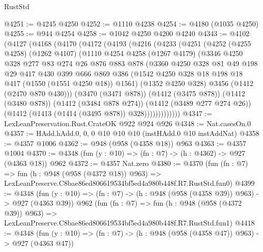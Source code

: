 \begin{lexlean}{RustStd}
\begin{coremodule}
@4251 := @4245 @4250
@4252 := @1110 @4238
@4254 := @4180 (@1035 @4250)
@4255 := @944 @4254
@4258 := @1042 @4250 @4200 @4240
@4343 := @4102
    (@4127
      (@4168
        (@4170
          (@4172
            (@4193
              (@4216
                (@4233
                  (@4251
                    (@4252
                      (@4255 @4258)
                      (@1262 @4107)
                      (@1110
                        @4254
                        @4258
                        (@1267 @4179)
                        (@3346
                          @4250
                          @328
                          @277
                          @83
                          @274
                          @26
                          @876
                          @883
                          @878
                          (@3360
                            @4250
                            @328
                            @81
                            @49
                            @198
                            @29
                            @417
                            @430
                            @399
                            @666
                            @869
                            @386
                            (@1542 @4250 @328 @18 @198 @18 @417 (@1550 (@1551 @4250 @18)) @1561)
                            (@1352 @4250 @328)
                            @3456
                            (@1412 (@2470 @870 @430)))
                          (@3470 (@3471 @878))
                          (@1412 (@3475 @878))
                          (@1412 (@3480 @878))
                          (@1412 (@3484 @878 @274))
                          (@1412 (@3489 @277 @274 @26))
                          (@1412 (@1413 (@1414 (@3495 @878)) @328)))))))))))))
@4347 := LexLeanPreservation.Rust.CrateOK @922 @924 @926
@4348 := Nat.casesOn.{0}
@4357 := HAdd.hAdd.{0, 0, 0} @10 @10 @10 (instHAdd.{0} @10 instAddNat)
@4358 := @4357 @1006
@4362 := @948 (@958 (@4358 @18)) @963
@4363 := @4357 @1004
@4370 := @4348 (fun (y : @10) => (fn : @7) -> (h : @4362) -> @927 (@4363 @18)) @962
@4372 := @4357 Nat.zero
@4380 := @4370
    (fun (fn : @7) =>
    fun (h : @948 (@958 (@4372 @18)) @963) =>
    LexLeanPreserve.C8bae86ed806619534bf5ed4a980b448f.R7.RustStd.fun0)
@4399 := @4348
    (fun (y : @10) => (fn : @7) -> (h : @948 (@958 (@4358 @39)) @963) -> @927 (@4363 @39))
    @962
    (fun (fn : @7) =>
    fun (h : @948 (@958 (@4372 @39)) @963) =>
    LexLeanPreserve.C8bae86ed806619534bf5ed4a980b448f.R7.RustStd.fun1)
@4418 := @4348
    (fun (y : @10) => (fn : @7) -> (h : @948 (@958 (@4358 @47)) @963) -> @927 (@4363 @47))

\end{coremodule}
\end{lexlean}
